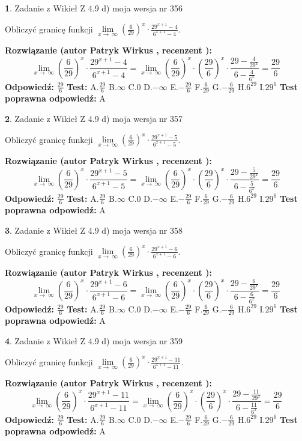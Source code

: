 \documentclass[12pt, a4paper]{article}
\theoremstyle{definition} %
\newtheorem{zad}{}
\newcommand{\zadStart}[1]{\begin{zad}#1\newline}
\newcommand{\zadStop}{\end{zad}}
\newcommand{\rozwStart}[2]{\noindent \textbf{Rozwiązanie (autor #1 , recenzent #2): }\newline}
\newcommand{\rozwStop}{\newline}
\newcommand{\odpStart}{\noindent \textbf{Odpowiedź:}\newline}
\newcommand{\odpStop}{\newline}
\newcommand{\testStart}{\noindent \textbf{Test:}\newline}
\newcommand{\testStop}{\newline}
\newcommand{\kluczStart}{\noindent \textbf{Test poprawna odpowiedź:}\newline}
\newcommand{\kluczStop}{\newline}
\begin{document}
\zadStart{Zadanie z Wikieł Z 4.9 d) moja wersja nr 356}


Obliczyć granicę funkcji  $\lim\limits_{x\to\ \infty}(\frac{6}{29})^{x}\cdot\frac{29^{x+1}-4}{6^{x+1}-4}$.
\zadStop
\rozwStart{Patryk Wirkus}{}
$$\lim\limits_{x\to\ \infty}(\frac{6}{29})^{x}\cdot\frac{29^{x+1}-4}{6^{x+1}-4}=\lim\limits_{x\to\ \infty}(\frac{6}{29})^{x}\cdot(\frac{29}{6})^{x} \cdot \frac{29-\frac{4}{29^{x}}}{6-\frac{4}{6^{x}}} = \frac{29}{6}$$
\rozwStop
\odpStart
$\frac{29}{6}$
\odpStop
\testStart
A.$\frac{29}{6}$ B.$\infty$ C.$0$ D.$-\infty$ E.$-\frac{29}{6}$
F.$\frac{6}{29}$ G.$-\frac{6}{29}$
H.$6^{29}$
I.$29^{6}$
\testStop
\kluczStart
A
\kluczStop



\zadStart{Zadanie z Wikieł Z 4.9 d) moja wersja nr 357}


Obliczyć granicę funkcji  $\lim\limits_{x\to\ \infty}(\frac{6}{29})^{x}\cdot\frac{29^{x+1}-5}{6^{x+1}-5}$.
\zadStop
\rozwStart{Patryk Wirkus}{}
$$\lim\limits_{x\to\ \infty}(\frac{6}{29})^{x}\cdot\frac{29^{x+1}-5}{6^{x+1}-5}=\lim\limits_{x\to\ \infty}(\frac{6}{29})^{x}\cdot(\frac{29}{6})^{x} \cdot \frac{29-\frac{5}{29^{x}}}{6-\frac{5}{6^{x}}} = \frac{29}{6}$$
\rozwStop
\odpStart
$\frac{29}{6}$
\odpStop
\testStart
A.$\frac{29}{6}$ B.$\infty$ C.$0$ D.$-\infty$ E.$-\frac{29}{6}$
F.$\frac{6}{29}$ G.$-\frac{6}{29}$
H.$6^{29}$
I.$29^{6}$
\testStop
\kluczStart
A
\kluczStop



\zadStart{Zadanie z Wikieł Z 4.9 d) moja wersja nr 358}


Obliczyć granicę funkcji  $\lim\limits_{x\to\ \infty}(\frac{6}{29})^{x}\cdot\frac{29^{x+1}-6}{6^{x+1}-6}$.
\zadStop
\rozwStart{Patryk Wirkus}{}
$$\lim\limits_{x\to\ \infty}(\frac{6}{29})^{x}\cdot\frac{29^{x+1}-6}{6^{x+1}-6}=\lim\limits_{x\to\ \infty}(\frac{6}{29})^{x}\cdot(\frac{29}{6})^{x} \cdot \frac{29-\frac{6}{29^{x}}}{6-\frac{6}{6^{x}}} = \frac{29}{6}$$
\rozwStop
\odpStart
$\frac{29}{6}$
\odpStop
\testStart
A.$\frac{29}{6}$ B.$\infty$ C.$0$ D.$-\infty$ E.$-\frac{29}{6}$
F.$\frac{6}{29}$ G.$-\frac{6}{29}$
H.$6^{29}$
I.$29^{6}$
\testStop
\kluczStart
A
\kluczStop



\zadStart{Zadanie z Wikieł Z 4.9 d) moja wersja nr 359}


Obliczyć granicę funkcji  $\lim\limits_{x\to\ \infty}(\frac{6}{29})^{x}\cdot\frac{29^{x+1}-11}{6^{x+1}-11}$.
\zadStop
\rozwStart{Patryk Wirkus}{}
$$\lim\limits_{x\to\ \infty}(\frac{6}{29})^{x}\cdot\frac{29^{x+1}-11}{6^{x+1}-11}=\lim\limits_{x\to\ \infty}(\frac{6}{29})^{x}\cdot(\frac{29}{6})^{x} \cdot \frac{29-\frac{11}{29^{x}}}{6-\frac{11}{6^{x}}} = \frac{29}{6}$$
\rozwStop
\odpStart
$\frac{29}{6}$
\odpStop
\testStart
A.$\frac{29}{6}$ B.$\infty$ C.$0$ D.$-\infty$ E.$-\frac{29}{6}$
F.$\frac{6}{29}$ G.$-\frac{6}{29}$
H.$6^{29}$
I.$29^{6}$
\testStop
\kluczStart
A
\kluczStop
\end{document}
